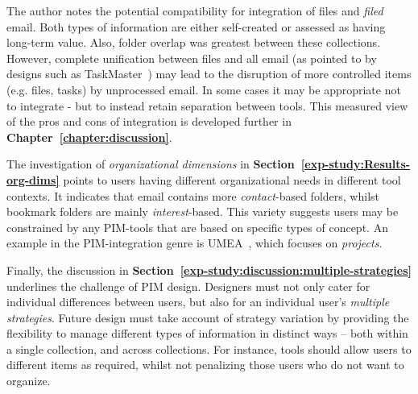The author notes the potential compatibility for integration of files and \textit{filed} email. Both types of information are either self-created or assessed as having long-term value.  Also, folder overlap was greatest between these collections.  However, complete unification between files and all email (as pointed to by designs such as TaskMaster~\citep{Bellotti:03}) may lead to the disruption of more controlled items (e.g. files, tasks) by unprocessed email. In some cases it may be appropriate not to integrate - but to instead retain separation between tools.  This measured view of the pros and cons of integration is developed further in \textbf{Chapter~\ref{chapter:discussion}}.

The investigation of \textit{organizational dimensions} in \textbf{Section~\ref{exp-study:Results-org-dims}} points to users having different organizational needs in different tool contexts.  It indicates that email contains more \textit{contact}-based folders, whilst bookmark folders are mainly \textit{interest}-based.  This variety suggests users may be constrained by any PIM-tools that are based on specific types of concept. An example in the PIM-integration genre is UMEA~\citep{Kaptelinin:03}, which focuses on \textit{projects}. 

Finally, the discussion in \textbf{Section~\ref{exp-study:discussion:multiple-strategies}} underlines the challenge of PIM design.  Designers must not only cater for individual differences between users, but also for an individual user's \textit{multiple strategies}.  Future design must take account of strategy variation by providing the flexibility to manage different types of information in distinct ways -- both within a single collection, and across collections. For instance, tools should allow users to different items as required, whilst not penalizing those users who do not want to organize. 






